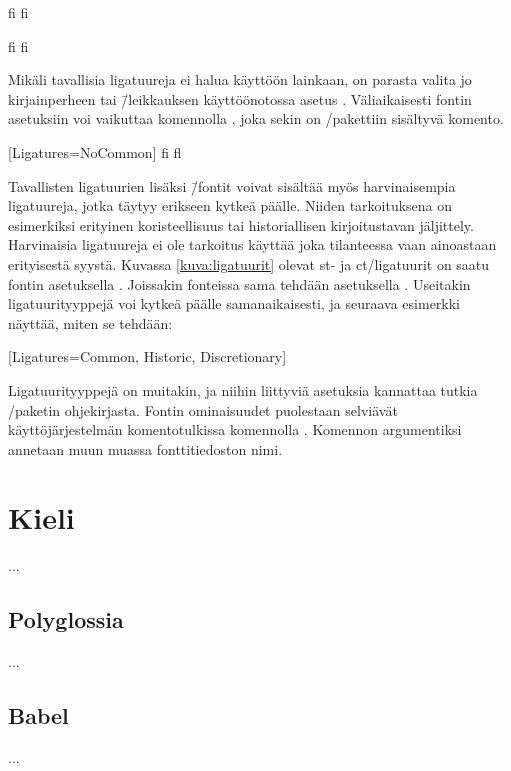 \pagebreak[3]

\begin{koodilohkosis}
  \Large
  fi f\textcompwordmark i
\end{koodilohkosis}

\begin{tulossis}
  \Large
  fi f\textcompwordmark i
\end{tulossis}

Mikäli tavallisia ligatuureja ei halua käyttöön lainkaan, on parasta
valita jo kirjainperheen tai \=/leikkauksen käyttöönotossa asetus
. Väliaikaisesti fontin asetuksiin
voi vaikuttaa komennolla , joka sekin
on \-/pakettiin sisältyvä komento.

\begin{koodilohkosis}
  \setmainfont{…}[Ligatures=NoCommon] %
  { fi fl} %
\end{koodilohkosis}

Tavallisten ligatuurien lisäksi  \=/fontit voivat
sisältää myös harvinaisempia ligatuureja, jotka täytyy erikseen kytkeä
päälle. Niiden tarkoituksena on esimerkiksi erityinen koristeellisuus
tai historiallisen kirjoitustavan jäljittely. Harvinaisia ligatuureja ei
ole tarkoitus käyttää joka tilanteessa vaan ainoastaan erityisestä
syystä. Kuvassa \ref{kuva:ligatuurit} olevat
{\erikoisfontti{}st-} ja
{\erikoisfontti{}ct}\-/ligatuurit on
saatu fontin asetuksella . Joissakin
fonteissa sama tehdään asetuksella . Useitakin ligatuurityyppejä voi kytkeä päälle
samanaikaisesti, ja seuraava esimerkki näyttää, miten se tehdään:

\begin{koodilohkosis}
  \setmainfont{…}[Ligatures={Common, Historic, Discretionary}]
\end{koodilohkosis}

Ligatuurityyppejä on muitakin, ja niihin liittyviä asetuksia kannattaa
tutkia \-/paketin ohjekirjasta.
Fontin ominaisuudet puolestaan selviävät käyttöjärjestelmän
komentotulkissa komennolla . Komennon argumentiksi
annetaan muun muassa fonttitiedoston nimi.

\section{Kieli}
\label{luku:kieliasetukset}

...

\subsection{Polyglossia}

...

\subsection{Babel}

...
